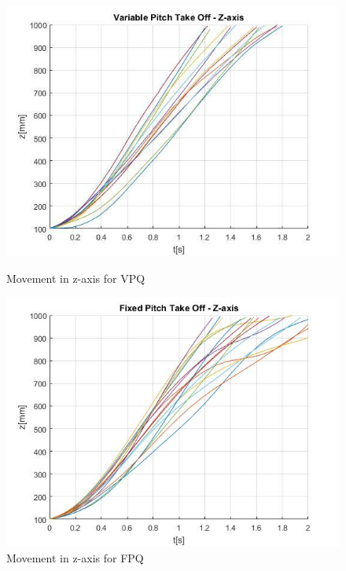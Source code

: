 \begin{figure}[H]
        \centering
        \begin{minipage}[b]{0.49\textwidth}
                    \includegraphics[width = \textwidth, angle= 0]{VAPIQ-PICTURES/vanjaVPQ}
                        \caption{Movement in z-axis for VPQ}
                    \label{fig:ddoo}
        \end{minipage}
                 \hfill
         \begin{minipage}[b]{0.49\textwidth}
                \includegraphics[width = \textwidth, angle =0]{VAPIQ-PICTURES/VanjaFPQ}
                  \caption{Movement in z-axis for FPQ}
                \label{fig:ooaa}
         \end{minipage}
\end{figure}

